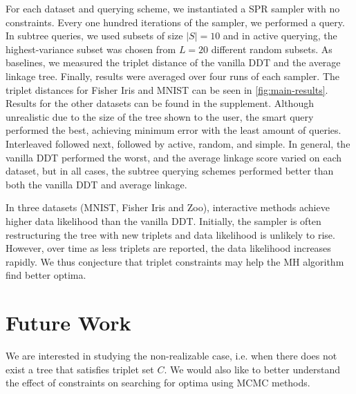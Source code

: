 For each dataset and querying scheme, we instantiated a SPR
sampler with no constraints. Every one hundred iterations of the 
sampler, we performed a query.
In subtree queries, we used subsets of size $|S| = 10$ 
and in active querying, the highest-variance subset was chosen from $L = 20$ different random subsets.
As baselines,
we measured the triplet distance of the vanilla DDT
and the average linkage tree.
Finally, results were averaged over four runs of each sampler.
The triplet distances for Fisher Iris and MNIST can be seen in \autoref{fig:main-results}. Results for the other datasets
can be found in the supplement.
Although unrealistic due to the size of the tree shown to the user, 
the smart query performed the best, achieving minimum error
with the least amount of queries. Interleaved followed next,
followed by active, random, and simple. In general, the vanilla
DDT performed the worst, and the average linkage
score varied on each dataset, but in all cases, the
subtree querying schemes performed better than both the vanilla DDT
and average linkage.

In three datasets (MNIST, Fisher Iris and Zoo), 
interactive methods
achieve higher data likelihood than the vanilla DDT.
Initially, the sampler is often restructuring the tree
with new triplets
and data likelihood is unlikely to rise. However, over time
as less triplets are reported,
the data likelihood increases rapidly.
We thus conjecture that triplet constraints 
may help the MH algorithm find better optima.

\section{Future Work}
We are interested in studying the non-realizable case, i.e.
when there does not exist a tree that satisfies triplet set $C$. We would also like to better understand the effect of constraints on searching
for optima using MCMC methods.